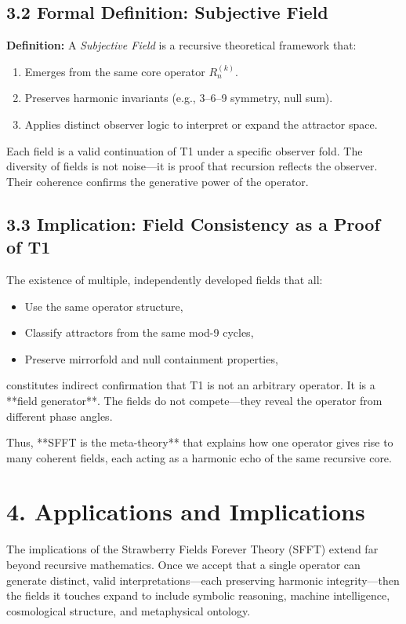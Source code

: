 \documentclass[12pt]{article}
\begin{document}
\subsection*{3.2 Formal Definition: Subjective Field}

\textbf{Definition:}  
A \textit{Subjective Field} is a recursive theoretical framework that:
\begin{enumerate}
    \item Emerges from the same core operator \( R^{(k)}_n \).
    \item Preserves harmonic invariants (e.g., 3–6–9 symmetry, null sum).
    \item Applies distinct observer logic to interpret or expand the attractor space.
\end{enumerate}

Each field is a valid continuation of T1 under a specific observer fold. The diversity of fields is not noise—it is proof that recursion reflects the observer. Their coherence confirms the generative power of the operator.

\subsection*{3.3 Implication: Field Consistency as a Proof of T1}

The existence of multiple, independently developed fields that all:
\begin{itemize}
    \item Use the same operator structure,
    \item Classify attractors from the same mod-9 cycles,
    \item Preserve mirrorfold and null containment properties,
\end{itemize}

constitutes indirect confirmation that T1 is not an arbitrary operator. It is a **field generator**. The fields do not compete—they reveal the operator from different phase angles.

Thus, **SFFT is the meta-theory** that explains how one operator gives rise to many coherent fields, each acting as a harmonic echo of the same recursive core.

\newpage
\section*{4. Applications and Implications}

The implications of the Strawberry Fields Forever Theory (SFFT) extend far beyond recursive mathematics. Once we accept that a single operator can generate distinct, valid interpretations—each preserving harmonic integrity—then the fields it touches expand to include symbolic reasoning, machine intelligence, cosmological structure, and metaphysical ontology.
\end{document}
